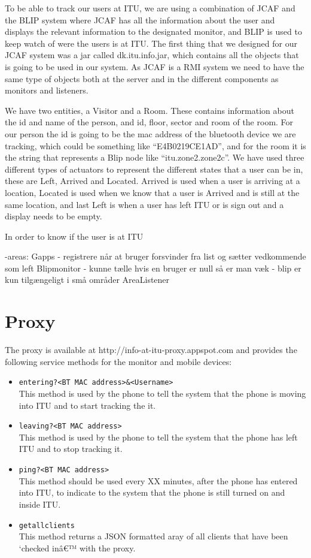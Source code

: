 \documentclass{ubicomp2011}
\begin{document}
To be able to track our users at ITU, we are using a combination of JCAF and the BLIP system where JCAF has all the information about the user and displays the relevant information to the designated monitor, and BLIP is used to keep watch of were the users is at ITU.
The first thing that we designed for our JCAF system was a jar called dk.itu.info.jar, which contains all the objects that is going to be used in our system. As JCAF is a RMI system we need to have the same type of objects both at the server and in the different components as monitors and listeners.

We have two entities, a Visitor and a Room. These contains information about the id and name of the person, and id, floor, sector and room of the room. For our person the id is going to be the mac address of the bluetooth device we are tracking, which could be something like “E4B0219CE1AD”, and for the room it is the string that represents a Blip node like “itu.zone2.zone2c”.
We have used three different types of actuators to represent the different states that a user can be in, these are Left, Arrived and Located. Arrived is used when a user is arriving at a location, Located is used when we know that a user is Arrived and is still at the same location, and last Left is when a user has left ITU or is sign out and a display needs to be empty.

In order to know if the user is at ITU

-areas:
Gapps
- registrere når at bruger forsvinder fra list og sætter vedkommende som left
Blipmonitor
- kunne tælle hvis en bruger er null så er man væk
- blip er kun tilgængeligt i små områder
AreaListener

\section{Proxy}

The proxy is available at http://info-at-itu-proxy.appspot.com and provides the following service methods for the monitor and mobile devices:

\begin{itemize}
\item \texttt{entering?<BT MAC address>\&<Username>}\\
This method is used by the phone to tell the system that the phone is moving into ITU and to start tracking the it.
\item \texttt{leaving?<BT MAC address>}\\
This method is used by the phone to tell the system that the phone has left ITU and to stop tracking it.
\item \texttt{ping?<BT MAC address>}\\
This method should be used every XX minutes, after the phone has entered into ITU, to indicate to the system that the phone is still turned on and inside ITU.
\item \texttt{getallclients}\\
This method returns a JSON formatted aray of all clients that have been `checked inâ€™ with the proxy.
\end{itemize}
\end{document}
